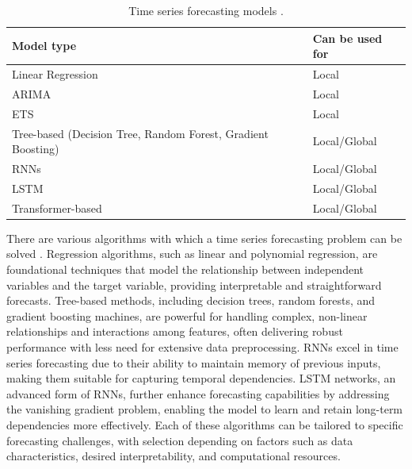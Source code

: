 \begin{table}[h]
    \centering
    \begin{tabular}{ll}
        \toprule
        \textbf{Model type}                                          & \textbf{Can be used for} \\
        \midrule
        Linear Regression                                            & Local                    \\
        \midrule
        \ac{ARIMA}                                                   & Local                    \\
        \midrule
        \ac{ETS}                                                     & Local                    \\
        \midrule
        Tree-based (Decision Tree, Random Forest, Gradient Boosting) & Local/Global             \\
        \midrule
        \ac{RNNs}                                                    & Local/Global             \\
        \midrule
        \ac{LSTM}                                                    & Local/Global             \\
        \midrule
        Transformer-based                                            & Local/Global             \\

        \bottomrule
    \end{tabular}
    \caption{Time series forecasting models \parencite{montero2021principles}.}
    \label{tab:timeseries_models}
\end{table}

There are various algorithms with which a time series forecasting problem can be
solved \parencite{salinas2020deepar}. Regression algorithms, such as linear and
polynomial regression, are foundational techniques that model the relationship
between independent variables and the target variable, providing interpretable
and straightforward forecasts. Tree-based methods, including decision trees,
random forests, and gradient boosting machines, are powerful for handling complex,
non-linear relationships and interactions among features, often delivering robust
performance with less need for extensive data preprocessing. \ac{RNNs} excel in
time series forecasting due to their ability to maintain memory of previous inputs,
making them suitable for capturing temporal dependencies. \ac{LSTM} networks, an
advanced form of \ac{RNNs}, further enhance forecasting capabilities by addressing
the vanishing gradient problem, enabling the model to learn and retain long-term
dependencies more effectively. Each of these algorithms can be tailored to specific
forecasting challenges, with selection depending on factors such as data characteristics,
desired interpretability, and computational resources.

